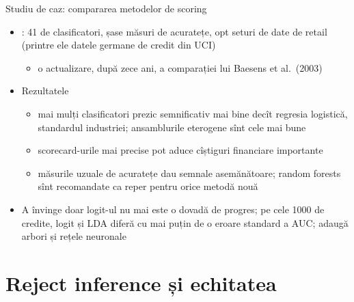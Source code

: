 \begin{frame}{Studiu de caz: compararea metodelor de scoring}
\itemsize{\small}
\begin{itemize}
    \item {}: 41 de clasificatori, șase măsuri de acuratețe, opt seturi de date de retail (printre ele datele germane de credit din UCI)
    \begin{itemize}
        \item o actualizare, după zece ani, a comparației lui Baesens et al.\ (2003)
    \end{itemize}
    \item Rezultatele
    \begin{itemize}
        \item mai mulți clasificatori prezic semnificativ mai bine decît regresia logistică, standardul industriei; ansamblurile eterogene sînt cele mai bune
        \item scorecard-urile mai precise pot aduce cîștiguri financiare importante
        \item măsurile uzuale de acuratețe dau semnale asemănătoare; random forests sînt recomandate ca reper pentru orice metodă nouă
    \end{itemize}
    \item A învinge doar logit-ul nu mai este o dovadă de progres; pe cele 1000 de credite, logit și LDA diferă cu mai puțin de o eroare standard a AUC;  adaugă arbori și rețele neuronale
\end{itemize}
\end{frame}


\section{Reject inference și echitatea}

